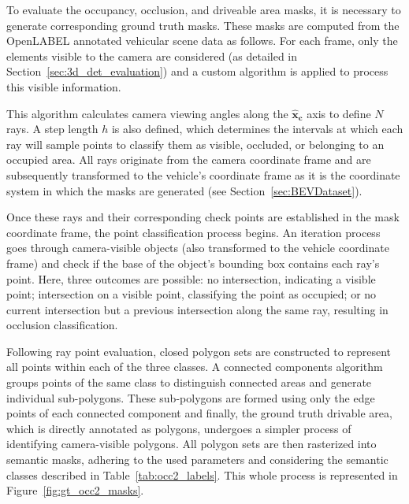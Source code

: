  \label{sec:bev_masks_evaluation_methodology}
To evaluate the occupancy, occlusion, and driveable area masks, it is necessary to generate corresponding ground truth masks. These masks are computed from the OpenLABEL annotated vehicular scene data as follows. For each frame, only the elements visible to the camera are considered (as detailed in Section~\ref{sec:3d_det_evaluation}) and a custom algorithm is applied to process this visible information.

This algorithm calculates camera viewing angles along the $\mathbf{\hat{x}_c}$ axis to define $N$ rays. A step length $h$ is also defined, which determines the intervals at which each ray will sample points to classify them as visible, occluded, or belonging to an occupied area. All rays originate from the camera coordinate frame and are subsequently transformed to the vehicle's coordinate frame as it is the coordinate system in which the  masks are generated (see Section~\ref{sec:BEVDataset}).

Once these rays and their corresponding check points are established in the  mask coordinate frame, the point classification process begins. An iteration process goes through camera-visible objects (also transformed to the vehicle coordinate frame) and check if the base of the object's bounding box contains each ray's point. Here, three outcomes are possible: no intersection, indicating a visible point; intersection on a visible point, classifying the point as occupied; or no current intersection but a previous intersection along the same ray, resulting in occlusion classification.

Following ray point evaluation, closed polygon sets are constructed to represent all points within each of the three classes. A connected components algorithm groups points of the same class to distinguish connected areas and generate individual sub-polygons. These sub-polygons are formed using only the edge points of each connected component and finally, the ground truth drivable area, which is directly annotated as polygons, undergoes a simpler process of identifying camera-visible polygons. All polygon sets are then rasterized into semantic masks, adhering to the used  parameters and considering the semantic classes described in Table~\ref{tab:occ2_labels}. This whole process is represented in Figure~\ref{fig:gt_occ2_masks}.  

